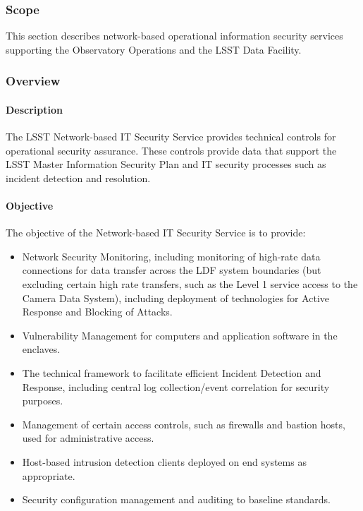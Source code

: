 \subsubsection{Scope}

This section describes network-based operational information security services
supporting the Observatory Operations and the LSST Data Facility.

\subsubsection{Overview}

\paragraph{Description}

The LSST Network-based IT Security Service provides technical controls for
operational security assurance. These controls provide data that support the
LSST Master Information Security Plan and IT security processes such as incident
detection and resolution.

\paragraph{Objective}

The objective of the Network-based IT Security Service is to provide:

\begin{itemize}
\item Network Security Monitoring, including monitoring of high-rate data
connections for data transfer across the LDF system boundaries (but excluding
certain high rate transfers, such as the Level 1 service access to the Camera
Data System), including deployment of technologies for Active Response and
Blocking of Attacks.
\item Vulnerability Management for computers and application software in the
enclaves.
\item The technical framework to facilitate efficient Incident Detection and
Response, including central log collection/event correlation for security purposes.
\item Management of certain access controls, such as firewalls and bastion hosts,
used for administrative access.
\item Host-based intrusion detection clients deployed on end systems as
appropriate.
\item Security configuration management and auditing to baseline standards.
\end{itemize}

